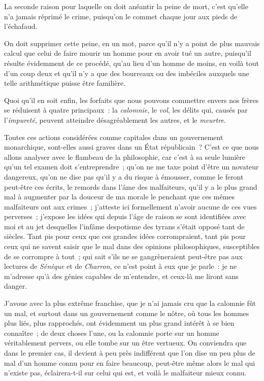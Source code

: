 \documentclass[french,twoside]{book} %
\begin{document}
La seconde raison pour laquelle on doit anéantir la peine de mort, c’est qu’elle n’a jamais réprimé le crime, puisqu’on le commet chaque jour aux pieds de l’échafaud.\par
On doit supprimer cette peine, en un mot, parce qu’il n’y a point de plus mauvais calcul que celui de faire mourir un homme pour en avoir tué un autre, puisqu’il résulte évidemment de ce procédé, qu’au lieu d’un homme de moins, en voilà tout d’un coup deux et qu’il n’y a que des bourreaux ou des imbéciles auxquels une telle arithmétique puisse être familière.\par
Quoi qu’il en soit enfin, les forfaits que nous pouvons commettre envers nos frères se réduisent à quatre principaux : la {\itshape calomnie}, le {\itshape vol}, les délits qui, causés par l’{\itshape impureté}, peuvent atteindre désagréablement les autres, et le {\itshape meurtre}.\par
Toutes ces actions considérées comme capitales dans un gouvernement monarchique, sont-elles aussi graves dans un État républicain ? C’est ce que nous allons analyser avec le flambeau de la philosophie, car c’est à sa seule lumière qu’un tel examen doit s’entreprendre ; qu’on ne me taxe point d’être un novateur dangereux, qu’on ne dise pas qu’il y a du risque à émousser, comme le feront peut-être ces écrits, le remords dans l’âme des malfaiteurs, qu’il y a le plus grand mal à augmenter par la douceur de ma morale le penchant que ces mêmes malfaiteurs ont aux crimes ; j’atteste ici formellement n’avoir aucune de ces vues perverses ; j’expose les idées qui depuis l’âge de raison se sont identifiées avec moi et au jet desquelles l’infâme despotisme des tyrans s’était opposé tant de siècles. Tant pis pour ceux que ces grandes idées corrompraient, tant pis pour ceux qui ne savent saisir que le mal dans des opinions philosophiques, susceptibles de se corrompre à tout ; qui sait s’ils ne se gangrèneraient peut-être pas aux lectures de {\itshape Sénèque} et de {\itshape Charron}, ce n’est point à eux que je parle : je ne m’adresse qu’à des génies capables de m’entendre, et ceux-là me liront sans danger.\par
J’avoue avec la plus extrême franchise, que je n’ai jamais cru que la calomnie fût un mal, et surtout dans un gouvernement comme le nôtre, où tous les hommes plus liés, plus rapprochés, ont évidemment un plus grand intérêt à se bien connaître ; de deux choses l’une, ou la calomnie porte sur un homme véritablement pervers, ou elle tombe sur un être vertueux. On conviendra que dans le premier cas, il devient à peu près indifférent que l’on dise un peu plus de mal d’un homme connu pour en faire beaucoup, peut-être même alors le mal qui n’existe pas, éclairera-t-il sur celui qui est, et voilà le malfaiteur mieux connu.\par
\end{document}
